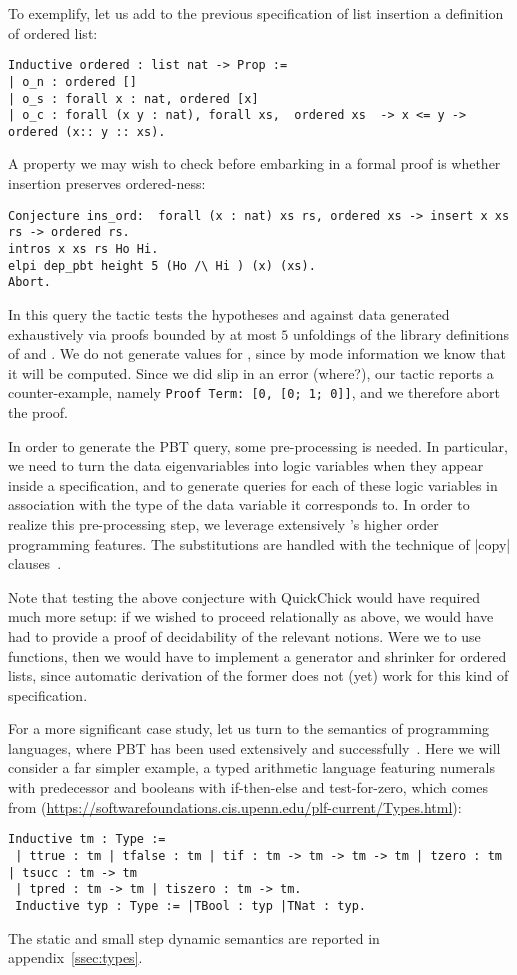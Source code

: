 To exemplify, let us add to the previous specification of list
insertion a definition of ordered list:
\begin{lstlisting}
Inductive ordered : list nat -> Prop :=
| o_n : ordered []
| o_s : forall x : nat, ordered [x]
| o_c : forall (x y : nat), forall xs,  ordered xs  -> x <= y -> ordered (x:: y :: xs).     
\end{lstlisting}
%
A property we may wish to check before embarking in a formal proof is
whether insertion preserves ordered-ness:
\begin{lstlisting}
Conjecture ins_ord:  forall (x : nat) xs rs, ordered xs -> insert x xs rs -> ordered rs.
intros x xs rs Ho Hi.
elpi dep_pbt height 5 (Ho /\ Hi ) (x) (xs).
Abort.
\end{lstlisting}
In this query the tactic tests the hypotheses  and 
against data  generated exhaustively via proofs bounded by
at most $5$ unfoldings of the library  definitions of
 and . We do not generate values for ,
since by mode information we know that it will be computed.
%
Since we did slip in an error (where?), our tactic reports a
counter-example, namely \verb|Proof Term: [0, [0; 1; 0]]|, and
we therefore abort the proof.


In order to generate the PBT query, some
pre-processing is needed. In particular, we need to turn the data
eigenvariables into \lP logic variables when they appear inside a
specification, and to generate queries %
for each of
these logic variables in association with the type of the data
variable it corresponds to.  In order to realize this pre-processing step,
we leverage extensively \lP's higher order programming features. The
substitutions are handled with the technique of \lsti|copy| clauses~\cite{miller91jlc}.

Note that testing the above conjecture with \textsf{QuickChick} would
have required much more setup: if we wished to proceed relationally as
above, we would have had to provide a proof of decidability of the
relevant notions. Were we to use functions, then we would have to
implement a generator and shrinker for ordered lists, since automatic
derivation of the former does not (yet) work for this kind of specification.


For a more significant case study, let us turn to the semantics of
programming languages, where PBT has been used extensively and
successfully~\cite{Klein12}. Here we will consider a far simpler example,
a typed arithmetic language featuring numerals with predecessor
and booleans with if-then-else and test-for-zero, which comes from
(\url{https://softwarefoundations.cis.upenn.edu/plf-current/Types.html}):
\begin{lstlisting}
Inductive tm : Type :=
 | ttrue : tm | tfalse : tm | tif : tm -> tm -> tm -> tm | tzero : tm | tsucc : tm -> tm
 | tpred : tm -> tm | tiszero : tm -> tm.
 Inductive typ : Type := |TBool : typ |TNat : typ.
\end{lstlisting}
The static and small step dynamic semantics are reported in appendix~\ref{ssec:types}.

